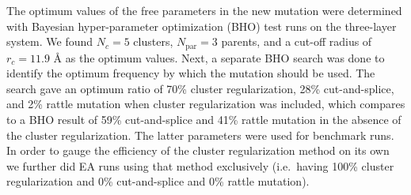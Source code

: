 \documentclass[aip,amsmath,amssymb,reprint]{revtex4-1}
\begin{document}
The optimum values of the free parameters in the new mutation were
determined with Bayesian hyper-parameter optimization (BHO) test runs on the three-layer system. We found $N_c=5$ clusters, $N_\mathrm{par}=3$
parents, and a cut-off radius of $r_c=11.9$ {\AA} as the optimum
values. Next, a separate BHO search was done to identify the optimum
frequency by which the mutation should be used. The search gave an
optimum ratio of 70\% cluster regularization, 28\% cut-and-splice, and 2\%
rattle mutation when cluster regularization was included, which
compares to a BHO result of 59\% cut-and-splice and
41\% rattle mutation in the absence of the cluster regularization. The
latter parameters were used for benchmark runs. In order to gauge the efficiency of
the cluster regularization method on its own we further did EA runs
using that method exclusively (i.e.\ having 100\% cluster
regularization and 0\% cut-and-splice and 0\% rattle mutation).
\end{document}
